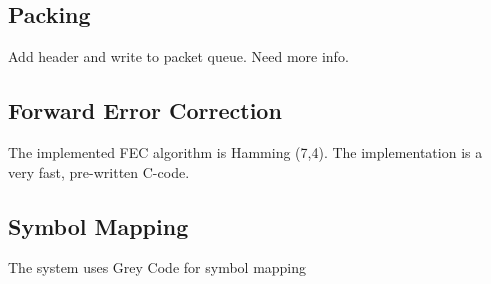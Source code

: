\subsection{Packing}
Add header and write to packet queue. Need more info.

\subsection{Forward Error Correction}
The implemented FEC algorithm is Hamming (7,4). The implementation is a very fast, pre-written C-code.

\subsection{Symbol Mapping}
The system uses Grey Code for symbol mapping 


